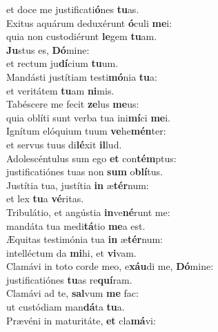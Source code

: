 \oddverse et doce me justificati\textbf{ó}nes \textbf{tu}as.\\
\evenverse Exitus aquárum deduxérunt \textbf{ó}culi \textbf{me}i:~\*\\
\evenverse quia non custodiérunt \textbf{le}gem \textbf{tu}am.\\
\oddverse \textbf{Ju}stus es, \textbf{Dó}mine:~\*\\
\oddverse et rectum ju\textbf{dí}cium \textbf{tu}um.\\
\evenverse Mandásti justítiam testi\textbf{mó}nia \textbf{tu}a:~\*\\
\evenverse et veritátem \textbf{tu}am \textbf{ni}mis.\\
\oddverse Tabéscere me fecit \textbf{ze}lus \textbf{me}us:~\*\\
\oddverse quia oblíti sunt verba tua ini\textbf{mí}ci \textbf{me}i.\\
\evenverse Ignítum elóquium tuum \textbf{ve}he\textbf{mén}ter:~\*\\
\evenverse et servus tuus di\textbf{lé}xit \textbf{il}lud.\\
\oddverse Adolescéntulus sum ego \textbf{et} con\textbf{tém}ptus:~\*\\
\oddverse justificatiónes tuas non \textbf{sum} o\textbf{blí}tus.\\
\evenverse Justítia tua, justítia \textbf{in} æ\textbf{tér}num:~\*\\
\evenverse et lex \textbf{tu}a \textbf{vé}ritas.\\
\oddverse Tribulátio, et angústia \textbf{in}ve\textbf{né}runt me:~\*\\
\oddverse mandáta tua medi\textbf{tá}tio \textbf{me}a est.\\
\evenverse Æquitas testimónia tua \textbf{in} æ\textbf{tér}num:~\*\\
\evenverse intelléctum da \textbf{mi}hi, et \textbf{vi}vam.\\
\oddverse Clamávi in toto corde meo, e\textbf{xáu}di me, \textbf{Dó}mine:~\*\\
\oddverse justificatiónes \textbf{tu}as re\textbf{quí}ram.\\
\evenverse Clamávi ad te, \textbf{sal}vum \textbf{me} fac:~\*\\
\evenverse ut custódiam man\textbf{dá}ta \textbf{tu}a.\\
\oddverse Prævéni in maturitáte, \textbf{et} cla\textbf{má}vi:~\*\\
